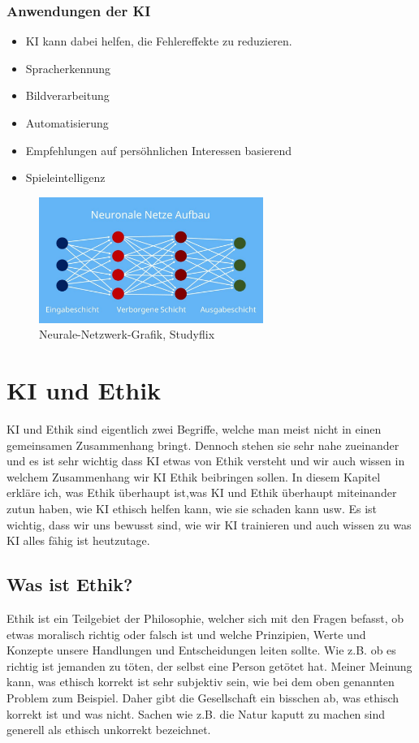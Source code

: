 \documentclass{report}
\begin{document}
\subsection{Anwendungen der KI}
\begin{itemize}
    \item KI kann dabei helfen, die Fehlereffekte zu reduzieren.
    \item Spracherkennung
    \item Bildverarbeitung
    \item Automatisierung
    \item Empfehlungen auf persöhnlichen Interessen basierend
    \item Spieleintelligenz
\end{itemize}
\begin{figure}[h]

    \centering 
 
    \includegraphics[width=0.65\textwidth]{img.jpg} 
 
    \caption{Neurale-Netzwerk-Grafik, Studyflix}
 
    \label{fig:meme}
 
 \end{figure}
 

\chapter{KI und Ethik}
KI und Ethik sind eigentlich zwei Begriffe, welche man meist nicht in einen gemeinsamen Zusammenhang bringt. Dennoch stehen sie sehr nahe zueinander und es ist sehr wichtig dass KI etwas von Ethik versteht und  wir auch wissen in welchem Zusammenhang wir KI Ethik beibringen sollen.
In diesem Kapitel erkläre ich, was Ethik überhaupt ist,was KI und Ethik überhaupt miteinander zutun haben, wie KI ethisch helfen kann, wie sie schaden kann usw.
Es ist wichtig, dass wir uns bewusst sind, wie wir KI trainieren und auch  wissen zu was KI alles fähig ist heutzutage.
\section{Was ist Ethik?}
Ethik ist ein Teilgebiet der Philosophie, welcher sich mit den Fragen befasst, ob etwas moralisch richtig oder falsch ist und welche Prinzipien, Werte und Konzepte unsere Handlungen und Entscheidungen leiten sollte. 
Wie z.B. ob es richtig ist jemanden zu töten, der selbst eine Person getötet hat.
Meiner Meinung kann, was ethisch korrekt ist sehr subjektiv sein, wie bei dem oben genannten Problem zum Beispiel. Daher gibt die Gesellschaft ein bisschen ab, was ethisch korrekt ist und was nicht. 
Sachen wie z.B. die Natur kaputt zu machen sind generell als ethisch unkorrekt bezeichnet.
\end{document}
